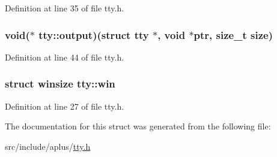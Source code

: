 Definition at line 35 of file tty.\+h.

\hypertarget{structtty_a2a619877d6ee5bb7caa115a931f98e2c}{
\subsubsection[{output}]{\setlength{\rightskip}{0pt plus 5cm}void($\ast$ tty\+::output)(struct {\bf tty} $\ast$, void $\ast$ptr, size\+\_\+t {\bf size})}}\label{structtty_a2a619877d6ee5bb7caa115a931f98e2c}


Definition at line 44 of file tty.\+h.

\hypertarget{structtty_af7fc07d18ca858dc99376525b8a437a3}{
\subsubsection[{win}]{\setlength{\rightskip}{0pt plus 5cm}struct {\bf winsize} tty\+::win}}\label{structtty_af7fc07d18ca858dc99376525b8a437a3}


Definition at line 27 of file tty.\+h.



The documentation for this struct was generated from the following file\+:\begin{DoxyCompactItemize}
\item 
src/include/aplus/\hyperlink{tty_8h}{tty.\+h}\end{DoxyCompactItemize}
